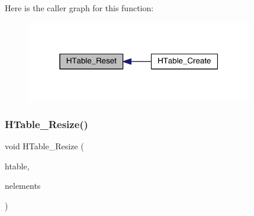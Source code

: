 Here is the caller graph for this function\+:\nopagebreak
\begin{figure}[H]
\begin{center}
\leavevmode
\includegraphics[width=280pt]{a00077_a8a914231592293527bd1f42cdfb346d4_icgraph}
\end{center}
\end{figure}
\mbox{\label{a00077_ad79cb786b03a73481fb3e5846d345801}} 
\subsubsection{\texorpdfstring{H\+Table\+\_\+\+Resize()}{HTable\_Resize()}}
{\footnotesize\ttfamily void H\+Table\+\_\+\+Resize (\begin{DoxyParamCaption}\item[{\hyperlink{a00650}{gk\+\_\+\+H\+Table\+\_\+t} $\ast$}]{htable,  }\item[{int}]{nelements }\end{DoxyParamCaption})}

